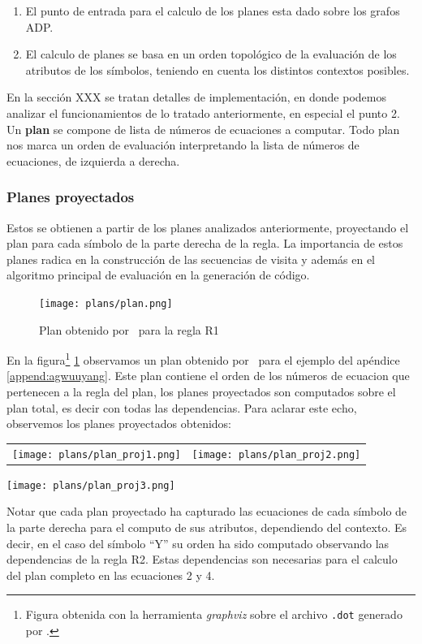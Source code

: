 \begin{enumerate}
\item El punto de entrada para el calculo de los planes esta dado sobre los grafos ADP. 
\item El calculo de planes se basa en un orden topológico de la evaluación de los atributos de los símbolos, teniendo en cuenta los distintos contextos posibles.
\end{enumerate}
En la sección XXX se tratan detalles de implementación, en donde podemos analizar el funcionamientos de lo tratado anteriormente, en especial el punto 2.
Un \textbf{plan} se compone de lista de números de ecuaciones a computar. Todo plan nos marca un orden de evaluación interpretando la lista de números de ecuaciones, de izquierda a derecha.

\subsubsection*{Planes proyectados}
Estos se obtienen a partir de los planes analizados anteriormente, proyectando el plan para cada símbolo de la parte derecha de la regla. La importancia de estos planes radica en la construcción de las secuencias de visita y además en el algoritmo principal de evaluación en la generación de código.
\begin{figure}\centering
 \texttt{[image: plans/plan.png]}
\caption{\label{fig:plan}Plan obtenido por \maggen\ para la regla R1}
\end{figure}

En la figura\footnote{Figura obtenida con la herramienta \textit{graphviz} sobre el archivo \texttt{.dot} generado por \maggen.} \ref{fig:plan} observamos un plan obtenido por \maggen\ para el ejemplo del apéndice \ref{append:agwuuyang}. Este plan contiene el orden de los números de ecuacion que pertenecen a la regla del plan, los planes proyectados son computados sobre el plan total, es decir con todas las dependencias. Para aclarar este echo, observemos los planes proyectados obtenidos:\\

\begin{tabular}{l l}
\texttt{[image: plans/plan\_proj1.png]} &
\texttt{[image: plans/plan\_proj2.png]} 
\end{tabular}
\begin{center}
 \texttt{[image: plans/plan\_proj3.png]}
\end{center}

Notar que cada plan proyectado ha capturado las ecuaciones de cada símbolo de la parte derecha para el computo de sus atributos, dependiendo del contexto. Es decir, en el caso del símbolo ``Y'' su orden ha sido computado observando las dependencias de la regla R2. Estas dependencias son necesarias para el calculo del plan completo en las ecuaciones 2 y 4. 


